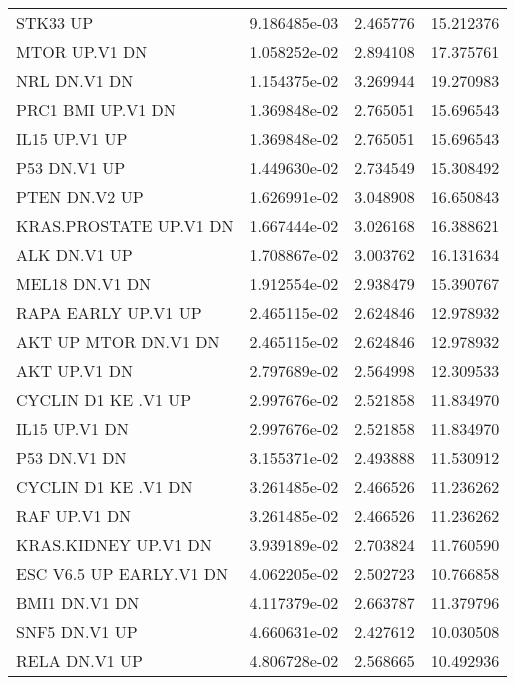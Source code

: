 \begin{tabular}{lrrr}
                          STK33 UP &      9.186485e-03 &  2.465776 &       15.212376 \\
                     MTOR UP.V1 DN &      1.058252e-02 &  2.894108 &       17.375761 \\
                      NRL DN.V1 DN &      1.154375e-02 &  3.269944 &       19.270983 \\
                 PRC1 BMI UP.V1 DN &      1.369848e-02 &  2.765051 &       15.696543 \\
                     IL15 UP.V1 UP &      1.369848e-02 &  2.765051 &       15.696543 \\
                      P53 DN.V1 UP &      1.449630e-02 &  2.734549 &       15.308492 \\
                     PTEN DN.V2 UP &      1.626991e-02 &  3.048908 &       16.650843 \\
            KRAS.PROSTATE UP.V1 DN &      1.667444e-02 &  3.026168 &       16.388621 \\
                      ALK DN.V1 UP &      1.708867e-02 &  3.003762 &       16.131634 \\
                    MEL18 DN.V1 DN &      1.912554e-02 &  2.938479 &       15.390767 \\
               RAPA EARLY UP.V1 UP &      2.465115e-02 &  2.624846 &       12.978932 \\
              AKT UP MTOR DN.V1 DN &      2.465115e-02 &  2.624846 &       12.978932 \\
                      AKT UP.V1 DN &      2.797689e-02 &  2.564998 &       12.309533 \\
               CYCLIN D1 KE .V1 UP &      2.997676e-02 &  2.521858 &       11.834970 \\
                     IL15 UP.V1 DN &      2.997676e-02 &  2.521858 &       11.834970 \\
                      P53 DN.V1 DN &      3.155371e-02 &  2.493888 &       11.530912 \\
               CYCLIN D1 KE .V1 DN &      3.261485e-02 &  2.466526 &       11.236262 \\
                      RAF UP.V1 DN &      3.261485e-02 &  2.466526 &       11.236262 \\
              KRAS.KIDNEY UP.V1 DN &      3.939189e-02 &  2.703824 &       11.760590 \\
           ESC V6.5 UP EARLY.V1 DN &      4.062205e-02 &  2.502723 &       10.766858 \\
                     BMI1 DN.V1 DN &      4.117379e-02 &  2.663787 &       11.379796 \\
                     SNF5 DN.V1 UP &      4.660631e-02 &  2.427612 &       10.030508 \\
                     RELA DN.V1 UP &      4.806728e-02 &  2.568665 &       10.492936 \\
\bottomrule
\end{tabular}
